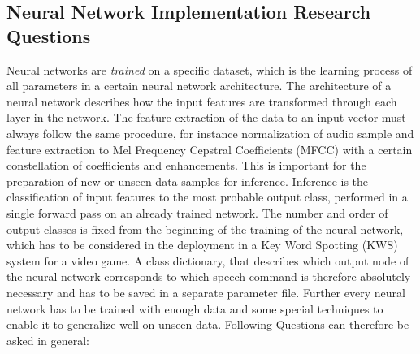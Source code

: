 
\subsection{Neural Network Implementation Research Questions}\label{sec:intro_rq_nn}
Neural networks are \emph{trained} on a specific dataset, which is the learning process of all parameters in a certain neural network architecture. 
The architecture of a neural network describes how the input features are transformed through each layer in the network.
The feature extraction of the data to an input vector must always follow the same procedure, for instance normalization of audio sample and feature extraction to Mel Frequency Cepstral Coefficients (MFCC) with a certain constellation of coefficients and enhancements.
This is important for the preparation of new or unseen data samples for inference.
Inference is the classification of input features to the most probable output class, performed in a single forward pass on an already trained network.
The number and order of output classes is fixed from the beginning of the training of the neural network, which has to be considered in the deployment in a Key Word Spotting (KWS) system for a video game.
A class dictionary, that describes which output node of the neural network corresponds to which speech command is therefore absolutely necessary and has to be saved in a separate parameter file.
Further every neural network has to be trained with enough data and some special techniques to enable it to generalize well on unseen data.
Following Questions can therefore be asked in general:

